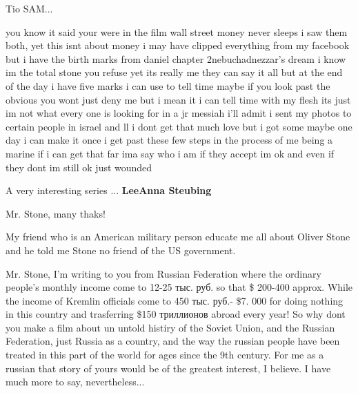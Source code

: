  
 
 
 
 

Tio SAM...


you know it said your were in the film wall street money never sleeps i saw
them both, yet this isnt about money i may have clipped everything from my
facebook but i have the birth marks from daniel chapter 2nebuchadnezzar's dream
i know im the total stone you refuse yet its really me they can say it all but
at the end of the day i have five marks i can use to tell time maybe if you
look past the obvious you wont just deny me but i mean it i can tell time with
my flesh its just im not what every one is looking for in a jr messiah i'll
admit i sent my photos to certain people in israel and ll i dont get that much
love but i got some maybe one day i can make it once i get past these few steps
in the process of me being a marine if i can get that far ima say who i am if
they accept im ok and even if they dont im still ok just wounded

A very interesting series ...
\textbf{LeeAnna Steubing}

Mr. Stone, many thaks!


My friend who is an American military person educate me all about Oliver Stone
and he told me Stone no friend of the US government.


Mr. Stone, I'm writing to you from Russian Federation where the ordinary people's
monthly income come to 12-25 тыс. руб. so that \$ 200-400 approx. While the income
of Kremlin officials come to 450 тыс. руб.- \$7. 000 for doing nothing in this
country and trasferring \$150 триллионов abroad every year! So why dont you make a
film about un untold histiry of the Soviet Union, and the Russian Federation,
just Russia as a country, and the way the russian people have been treated in
this part of the world for ages since the 9th century. For me as a russian that
story of yours would be of the greatest interest, I believe. I have much more to
say, nevertheless...

